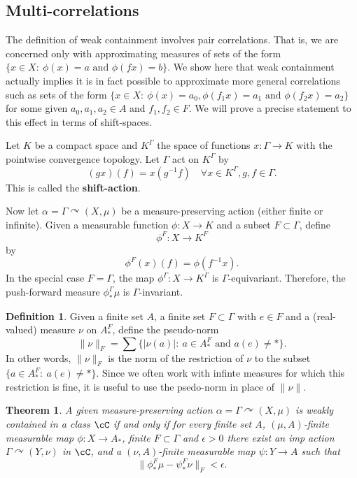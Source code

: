 \documentclass[12pt]{article}
\theoremstyle{plain}
\newtheorem{thm}{Theorem}[section]
\theoremstyle{definition}
\newtheorem{defn}{Definition}
\theoremstyle{remark}
\newcommand{\G}{\Gamma}
\newcommand{\eps}{\epsilon}
\renewcommand\a{\alpha}
\def\cc{{\curvearrowright}}
\begin{document}
\subsection{Multi-correlations}

The definition of weak containment involves pair correlations. That is, we are concerned only with approximating measures of sets of the form $\{x\in X:~\phi(x)=a \textrm{ and } \phi(fx) = b\}$.
We show here that weak containment actually implies it is in fact possible to approximate more general correlations such as sets of the form
$\{x\in X:~\phi(x)=a_0, \phi(f_1x) = a_1 \textrm{ and } \phi(f_2x) = a_2\}$ for some given $a_0, a_1,a_2\in A$ and $f_1,f_2\in F$. We will prove a precise statement to this effect in terms of shift-spaces.

Let $K$ be a compact space and $K^\G$ the space of functions $x:\G \to K $ with the pointwise convergence topology. Let $\G$ act on $K^\G$ by
$$(gx)(f)=x(g^{-1}f) \quad \forall x\in K^\G, g,f \in \G.$$
This is called the {\bf shift-action}. 

Now let $\a=\G \cc (X,\mu)$ be a measure-preserving action (either finite or infinite). Given a measurable function $\phi:X \to K$ and a subset $F \subset \G$, define
$$\phi^F:X \to K^F$$
by
$$\phi^F(x)(f) = \phi(f^{-1}x).$$
In the special case $F=\G$, the map $\phi^\G:X \to K^\G$ is $\G$-equivariant. Therefore, the push-forward measure $\phi^\G_*\mu$ is $\G$-invariant. 

\begin{defn}
    Given a finite set $A$, a finite set $F \subset \G$ with $e\in F$ and a (real-valued) measure $\nu$ on $A_*^F$, define the pseudo-norm
    $$\|\nu\|_F = \sum \{ |\nu(a)|:~ a\in A_*^F \textrm{ and } a(e)\ne *\}.$$
    In other words, $\|\nu\|_F$ is the norm of the restriction of $\nu$ to the subset $\{a\in A_*^F:~a(e)\ne *\}$. 
    Since we often work with infinte measures for which this restriction is fine, it is useful to use the psedo-norm in place of $\|\nu\|$.
\end{defn}


\begin{thm}\label{T:general-correlations}
A given measure-preserving action $\a=\G \cc (X,\mu)$ is weakly contained in a class $\cC$ if and only if for every finite set $A$, $(\mu,A)$-finite measurable map $\phi:X \to A_*$, finite $F \subset \G$ and $\eps>0$ there exist an imp action $\G \cc (Y,\nu)$ in $\cC$, and a $(\nu,A)$-finite measurable map $\psi:Y \to A$ such that 
$$\|\phi^F_*\mu - \psi^F_*\nu\|_F < \eps.$$
\end{thm}
\end{document}

